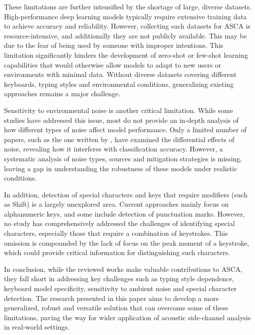\documentclass[a4paper,11pt,twoside]{report}
\theoremstyle{definition}
\begin{document}
These limitations are further intensified by the shortage of large, diverse datasets. High-performance deep learning models typically require extensive training data to achieve accuracy and reliability. However, collecting such datasets for ASCA is resource-intensive, and additionally they are not publicly available. This may be due to the fear of being used by someone with improper intentions. This limitation significantly hinders the development of zero-shot or few-shot learning capabilities that would otherwise allow models to adapt to new users or environments with minimal data. Without diverse datasets covering different keyboards, typing styles and environmental conditions, generalizing existing approaches remains a major challenge.

Sensitivity to environmental noise is another critical limitation. While some studies have addressed this issue, most do not provide an in-depth analysis of how different types of noise affect model performance. Only a limited number of papers, such as the one written by \textit{\cite{anand2018keyboard}}, have examined the differential effects of noise, revealing how it interferes with classification accuracy. However, a systematic analysis of noise types, sources and mitigation strategies is missing, leaving a gap in understanding the robustness of these models under realistic conditions.

In addition, detection of special characters and keys that require modifiers (such as Shift) is a largely unexplored area. Current approaches mainly focus on alphanumeric keys, and some include detection of punctuation marks. However, no study has comprehensively addressed the challenges of identifying special characters, especially those that require a combination of keystrokes. This omission is compounded by the lack of focus on the peak moment of a keystroke, which could provide critical information for distinguishing such characters.

In conclusion, while the reviewed works make valuable contributions to ASCA, they fall short in addressing key challenges such as typing style dependence, keyboard model specificity, sensitivity to ambient noise and special character detection. The research presented in this paper aims to develop a more generalized, robust and versatile solution that can overcome some of these limitations, paving the way for wider application of acoustic side-channel analysis in real-world settings.
\end{document}
